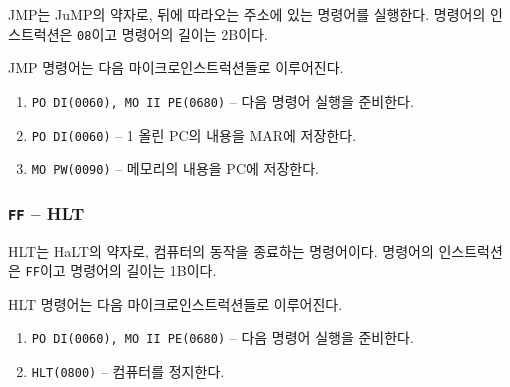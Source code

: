 \documentclass{article}
\begin{document}
JMP는 JuMP의 약자로, 뒤에 따라오는 주소에 있는 명령어를 실행한다.
명령어의 인스트럭션은 \texttt{08}이고 명령어의 길이는 2B이다.

JMP 명령어는 다음 마이크로인스트럭션들로 이루어진다.

\begin{enumerate}
    \item \texttt{PO DI(0060), MO II PE(0680)} -- 다음 명령어 실행을 준비한다.
    \setcounter{enumi}{2}
    \item \texttt{PO DI(0060)} -- 1 올린 PC의 내용을 MAR에 저장한다.
    \item \texttt{MO PW(0090)} -- 메모리의 내용을 PC에 저장한다.
\end{enumerate}

\subsubsection{\texttt{FF} -- HLT}

HLT는 HaLT의 약자로, 컴퓨터의 동작을 종료하는 명령어이다.
명령어의 인스트럭션은 \texttt{FF}이고 명령어의 길이는 1B이다.

HLT 명령어는 다음 마이크로인스트럭션들로 이루어진다.

\begin{enumerate}
    \item \texttt{PO DI(0060), MO II PE(0680)} -- 다음 명령어 실행을 준비한다.
    \setcounter{enumi}{2}
    \item \texttt{HLT(0800)} -- 컴퓨터를 정지한다.
\end{enumerate}
\end{document}
